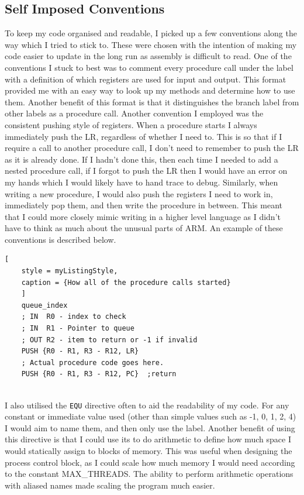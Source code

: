 \subsection{Self Imposed Conventions}
To keep my code organised and readable, I picked up a few conventions along the way which I tried to stick to. These were chosen with the intention of making my code easier to update in the long run as assembly is difficult to read. One of the conventions I stuck to best was to comment every procedure call under the label with a definition of which registers are used for input and output. This format provided me with an easy way to look up my methods and determine how to use them. Another benefit of this format is that it distinguishes the branch label from other labels as a procedure call. Another convention I employed was the consistent pushing style of registers. When a procedure starts I always immediately push the LR, regardless of whether I need to. This is so that if I require a call to another procedure call, I don't need to remember to push the LR as it is already done. If I hadn't done this, then each time I needed to add a nested procedure call, if I forgot to push the LR then I would have an error on my hands which I would likely have to hand trace to debug. Similarly, when writing a new procedure, I would also push the registers I need to work in, immediately pop them, and then write the procedure in between. This meant that I could more closely mimic writing in a higher level language as I didn't have to think as much about the unusual parts of ARM. An example of these conventions is described below.
\begin{lstlisting}[
	style = myListingStyle,
	caption = {How all of the procedure calls started}
	]
	queue_index
	; IN  R0 - index to check
	; IN  R1 - Pointer to queue
	; OUT R2 - item to return or -1 if invalid
	PUSH {R0 - R1, R3 - R12, LR}
	; Actual procedure code goes here.	
	PUSH {R0 - R1, R3 - R12, PC}  ;return
	
\end{lstlisting}
I also utilised the \verb|EQU| directive often to aid the readability of my code. For any constant or immediate value used (other than simple values such as -1, 0, 1, 2, 4) I would aim to name them, and then only use the label. Another benefit of using this directive is that I could use its to do arithmetic to define how much space I would statically assign to blocks of memory. This was useful when designing the process control block, as I could scale how much memory I would need according to the constant MAX\_THREADS. The ability to perform arithmetic operations with aliased names made scaling the program much easier. 
